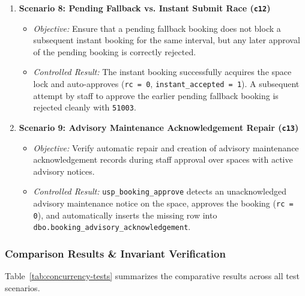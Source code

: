 \begin{enumerate}[leftmargin=*]
    \item \textbf{Scenario 8: Pending Fallback vs. Instant Submit Race (\texttt{c12})}
    \begin{itemize}
        \item \emph{Objective:} Ensure that a pending fallback booking does not block a subsequent instant booking for the same interval, but any later approval of the pending booking is correctly rejected.
        \item \emph{Controlled Result:} The instant booking successfully acquires the space lock and auto-approves (\texttt{rc = 0}, \texttt{instant\_accepted = 1}). A subsequent attempt by staff to approve the earlier pending fallback booking is rejected cleanly with \texttt{51003}.
    \end{itemize}

    \item \textbf{Scenario 9: Advisory Maintenance Acknowledgement Repair (\texttt{c13})}
    \begin{itemize}
        \item \emph{Objective:} Verify automatic repair and creation of advisory maintenance acknowledgement records during staff approval over spaces with active advisory notices.
        \item \emph{Controlled Result:} \texttt{usp\_booking\_approve} detects an unacknowledged advisory maintenance notice on the space, approves the booking (\texttt{rc = 0}), and automatically inserts the missing row into \texttt{dbo.booking\_advisory\_acknowledgement}.
    \end{itemize}
\end{enumerate}

\subsubsection{Comparison Results \& Invariant Verification}

Table~\ref{tab:concurrency-tests} summarizes the comparative results across all test scenarios.

